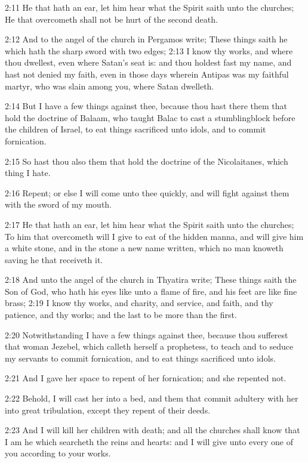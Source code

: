 2:11 He that hath an ear, let him hear what the Spirit saith unto the
churches; He that overcometh shall not be hurt of the second death.

2:12 And to the angel of the church in Pergamos write; These things
saith he which hath the sharp sword with two edges; 2:13 I know thy
works, and where thou dwellest, even where Satan's seat is: and thou
holdest fast my name, and hast not denied my faith, even in those days
wherein Antipas was my faithful martyr, who was slain among you, where
Satan dwelleth.

2:14 But I have a few things against thee, because thou hast there
them that hold the doctrine of Balaam, who taught Balac to cast a
stumblingblock before the children of Israel, to eat things sacrificed
unto idols, and to commit fornication.

2:15 So hast thou also them that hold the doctrine of the
Nicolaitanes, which thing I hate.

2:16 Repent; or else I will come unto thee quickly, and will fight
against them with the sword of my mouth.

2:17 He that hath an ear, let him hear what the Spirit saith unto the
churches; To him that overcometh will I give to eat of the hidden
manna, and will give him a white stone, and in the stone a new name
written, which no man knoweth saving he that receiveth it.

2:18 And unto the angel of the church in Thyatira write; These things
saith the Son of God, who hath his eyes like unto a flame of fire, and
his feet are like fine brass; 2:19 I know thy works, and charity, and
service, and faith, and thy patience, and thy works; and the last to
be more than the first.

2:20 Notwithstanding I have a few things against thee, because thou
sufferest that woman Jezebel, which calleth herself a prophetess, to
teach and to seduce my servants to commit fornication, and to eat
things sacrificed unto idols.

2:21 And I gave her space to repent of her fornication; and she
repented not.

2:22 Behold, I will cast her into a bed, and them that commit adultery
with her into great tribulation, except they repent of their deeds.

2:23 And I will kill her children with death; and all the churches
shall know that I am he which searcheth the reins and hearts: and I
will give unto every one of you according to your works.

